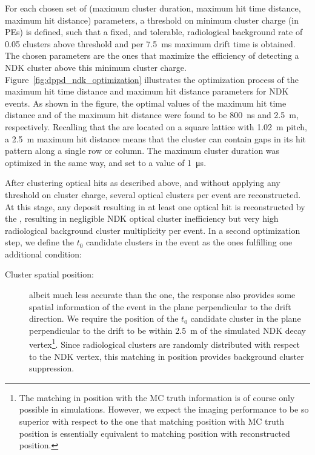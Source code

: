 For each chosen set of (maximum cluster duration, maximum hit time distance, maximum hit distance) parameters, a threshold on minimum cluster charge (in PEs) is defined, such that a fixed, and tolerable, radiological background rate of 0.05 clusters above threshold and per \SI{7.5}{\milli\s} maximum drift time is obtained. The chosen parameters are the ones that maximize the efficiency of detecting a NDK cluster above this minimum cluster charge. Figure~\ref{fig:dppd_ndk_optimization} illustrates the optimization process of the maximum hit time distance and maximum hit distance parameters for NDK events. As shown in the figure, the optimal values of the maximum hit time distance and of the maximum hit distance were found to be \SI{800}{\ns} and \SI{2.5}{\m}, respectively. Recalling that the  are located on a square lattice with \SI{1.02}{\m} pitch, a \SI{2.5}{\m} maximum hit distance means that the cluster can contain gaps in its hit pattern along a single  row or column. The maximum cluster duration was optimized in the same way, and set to a value of \SI{1}{\us}.

After clustering optical hits as described above, and without applying any threshold on cluster charge, several optical clusters per event are reconstructed. At this stage, any deposit resulting in at least one optical hit is reconstructed by the , resulting in negligible NDK optical cluster inefficiency but very high radiological background cluster multiplicity per event. In a second optimization step, we define the $t_0$ candidate clusters in the event as the ones fulfilling one additional condition:
\begin{description}
\item[Cluster spatial position:] albeit much less accurate than the  one, the  response also provides some spatial information of the event in the plane perpendicular to the drift direction. We require the position of the $t_0$ candidate cluster in the plane perpendicular to the drift to be within \SI{2.5}{\m} of the simulated NDK decay vertex\footnote{The matching in position with the MC truth information is of course only possible in simulations. However, we expect the  imaging performance to be so superior with respect to the  one that matching  position with MC truth position is essentially equivalent to matching  position with  reconstructed position.}. Since radiological clusters are randomly distributed with respect to the NDK vertex, this matching in position provides background cluster suppression.
\end{description}

